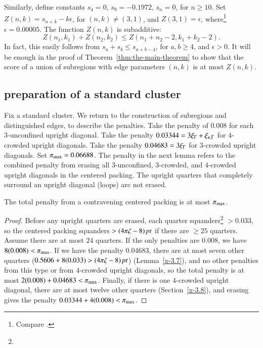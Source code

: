 Similarly, define constants $s_4=0$, $s_9 = -0.1972$, $s_{n}=0$, for
$n\ge10$.  Set $Z(n,k) = s_{n+k}-k\epsilon$, for $(n,k)\ne (3,1)$, and
$Z(3,1)=\epsilon$, where\footnote{Compare .} %
 $\epsilon=0.00005$. The function
$Z(n,k)$ is subadditive:
    $$Z(n_1,k_1)+Z(n_2,k_2) \le Z(n_1+n_2-2,k_1+k_2-2).$$
In fact, this easily follows from $s_a+s_b\le s_{a+b-4}$, for $a,b\ge
4$, and $\epsilon>0$. It will be enough in the proof of
Theorem~\ref{thm:the-main-theorem} to show that the score of a union of
subregions with edge parameters $(n,k)$ is at most $Z(n,k)$.


\subsection{preparation of a standard cluster} %
   \label{sec:prep-cluster}

Fix a standard cluster.  We return to the construction of
subregions and distinguished edges, to describe the penalties.
Take the penalty of $0.008$ for each $3$-unconfined upright
diagonal. Take the penalty $0.03344 = 3\xi_\Gamma+\xi_{\kappa,\Gamma}$ for $4$-crowded
upright diagonals. Take the penalty $0.04683=3\xi_\Gamma$ for
$3$-crowded upright diagonals. Set $\pi_{\max}=0.06688$. The penalty
in the next lemma refers to the combined penalty from erasing all
$3$-unconfined, $3$-crowded, and $4$-crowded upright diagonals in
the centered packing. The upright quarters that completely
surround an upright diagonal (loops) are not erased.

\begin{lemma}
The total penalty from a contravening centered packing is at most
$\pi_{\max}$.
\end{lemma}

\begin{proof}
Before any upright quarters are erased, each quarter
squanders\footnote{} %
$>0.033$, so the centered packing squanders $>(4\pi\zeta-8)\,\hbox{\it pt}$ if there
are $\ge25$ quarters.  Assume there are at most $24$ quarters. If
the only penalties are $0.008$, we have $8(0.008)<\pi_{\max}$. If we
have the penalty $0.04683$, there are at most seven other quarters
($0.5606+8(0.033)>(4\pi\zeta-8)\,\hbox{\it pt}$) (Lemma~\ref{x-3.7}), and no other
penalties from this type or from $4$-crowded upright diagonals, so
the total penalty is at most $2(0.008)+ 0.04683 < \pi_{\max}$.
Finally, if there is one $4$-crowded upright diagonal, there are
at most twelve other quarters (Section~\ref{x-3.8}), and erasing
gives the penalty $0.03344+4 (0.008)<\pi_{\max}$.
\end{proof}

